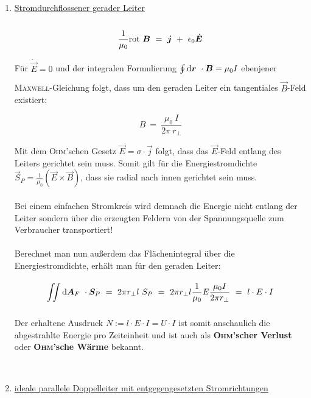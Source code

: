 \begin{enumerate}[label=\roman*]
	\item \underline{Stromdurchflossener gerader Leiter}\\
	\ \\
	\begin{equation*}
	\frac{1}{\mu_0} \text{rot } \bm{B} \ = \ \bm{j} \ + \ \epsilon_0 \dot{\bm{E}}
	\end{equation*}
	
	Für $\dot{\vec{E}}=0$ und der integralen Formulierung $\oint\limits_{{}}^{{}}\mathrm{d}{\bm{r}}\  \cdot \bm{B} = \mu_0 I$ ebenjener \textsc{Maxwell}-Gleichung folgt, dass um den geraden Leiter ein tangentiales $\vec{B}$-Feld existiert:
	
	\begin{equation*}
	B \ = \ \frac{\mu_0 \ I}{2\pi \ r_{\perp}}
	\end{equation*}
	
	Mit dem \textsc{Ohm}'schen Gesetz $\vec{E} = \sigma \cdot\vec{j}$ folgt, dass das $\vec{E}$-Feld entlang des Leiters gerichtet sein muss. Somit gilt für die Energiestromdichte $\vec{S}_P = \frac{1}{\mu_0} \left(\vec{E}\times\vec{B}\right)$, dass sie radial nach innen gerichtet sein muss.\\
	\ \\
	Bei einem einfachen Stromkreis wird demnach die Energie nicht entlang der Leiter sondern über die erzeugten Feldern von der Spannungsquelle zum Verbraucher transportiert!\\
	\ \\
	Berechnet man nun außerdem das Flächenintegral über die Energiestromdichte, erhält man für den geraden Leiter:
	
	\begin{equation*}
	\Iint{}{}{\vec{A}_F}\cdot\vec{S}_P \ = \ 2\pi r_{\perp} l \ S_P \ = \ 2\pi r_{\perp} l \frac{1}{\mu_0}E\frac{\mu_0 I}{2\pi r_{\perp}} \ = \ l \cdot E \cdot I
	\end{equation*}
	
	Der erhaltene Ausdruck $N := l \cdot E \cdot I = U \cdot I$ ist somit anschaulich die abgestrahlte Energie pro Zeiteinheit und ist auch als \textbf{\textsc{Ohm}'scher Verlust} oder \textbf{\textsc{Ohm}'sche Wärme} bekannt.
	
	\ \\
	
	\item \underline{ideale parallele Doppelleiter mit entgegengesetzten Stromrichtungen}
	\ \\
	

\end{enumerate}
